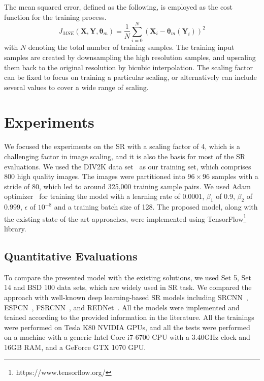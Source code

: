 \documentclass[10pt,twocolumn,letterpaper]{article}
\begin{document}
The mean squared error, defined as the following, is employed as the cost function for the training process.
\begin{equation}
\label{eq:mse}
J_{MSE}(\mathbf{X}, \mathbf{Y}, \boldsymbol{\theta}_m) = \frac{1}{N} \sum_{i=0}^{N}\left ( {\mathbf{X}}_i - {\boldsymbol{\theta}}_m ({\mathbf{Y}}_i) \right )^2
\end{equation}
with $N$ denoting the total number of training samples.
The training input samples are created by downsampling the high resolution samples,
and upscaling them back to the original resolution by bicubic interpolation. The scaling
factor can be fixed to focus on training a particular scaling, or alternatively can include
several values to cover a wide range of scaling.

\section{Experiments}
\label{experiments}
We focused the experiments on the SR with a scaling factor of 4, which is a challenging factor
in image scaling, and it is also the basis for most of the SR evaluations. We used the DIV2K data 
set~\cite{div2k} as our training set, which comprises 800 high quality images. The images were 
partitioned into $96 \times 96$ samples with a stride of 80, which led to around 325,000 training 
sample pairs. We used Adam optimizer~\cite{adam} for training the model with a learning rate of 
0.0001, $\beta_1$ of 0.9, $\beta_2$ of 0.999, $\epsilon$ of $10^{-8}$ and a training batch
size of 128. The proposed model, along with the existing state-of-the-art approaches, were implemented
using TensorFlow\footnote{https://www.tensorflow.org/} library.


\subsection{Quantitative Evaluations}
\label{sec:comparison}
To compare the presented model with the existing solutions, we used Set 5, Set 14 and BSD 100 data sets, which
are widely used in SR task. We compared the approach with well-known deep learning-based
SR models including SRCNN~\cite{dong2014},
ESPCN~\cite{shi2016}, FSRCNN~\cite{dong2016b}, and REDNet~\cite{mao2016}.
All the models were implemented and trained according to the provided information in the literature. All the trainings
were performed on Tesla K80 NVIDIA GPUs, and all the tests were performed on a machine with a generic
Intel Core i7-6700 CPU with a 3.40GHz clock and 16GB RAM, and a GeForce GTX 1070 GPU.
\end{document}

